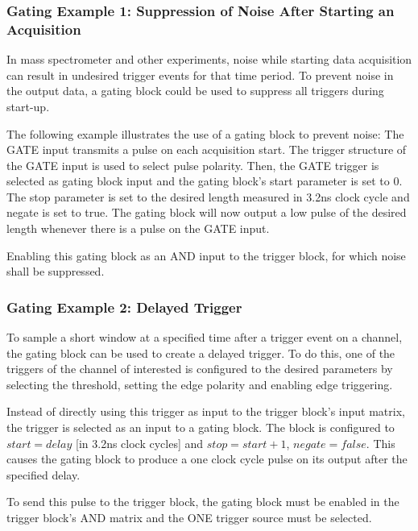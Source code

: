         \subsubsection{Gating Example 1: Suppression of Noise After Starting an Acquisition}

            In mass spectrometer and other experiments, noise while starting data acquisition can result in undesired trigger events for that time period. To prevent noise in the output data, a gating block could be used to suppress all triggers during start-up.\par

            The following example illustrates the use of a gating block to prevent noise: The GATE input transmits a pulse on each acquisition start. The trigger structure of the GATE input is used to select pulse polarity. Then, the GATE trigger is selected as gating block input and the gating block's start parameter is set to 0. The stop parameter is set to the desired length measured in 3.2ns clock cycle and negate is set to true. The gating block will now output a low pulse of the desired length whenever there is a pulse on the GATE input.\par

        Enabling this gating block as an AND input to the trigger block, for which noise shall be suppressed.

        \subsubsection{Gating Example 2: Delayed Trigger}

            To sample a short window at a specified time after a trigger event on a channel, the gating block can be used to create a delayed trigger. To do this, one of the triggers of the channel of interested is configured to the desired parameters by selecting the threshold, setting the edge polarity and enabling edge triggering.\par

            Instead of directly using this trigger as input to the trigger block's input matrix, the trigger is selected as an input to a gating block. The block is configured to $start = delay$ [in 3.2ns clock cycles] and $stop = start+1$, $negate = false$. This causes the gating block to produce a one clock cycle pulse on its output after the specified delay.\par

            To send this pulse to the trigger block, the gating block must be enabled in the trigger block's AND matrix and the ONE trigger source must be selected.

